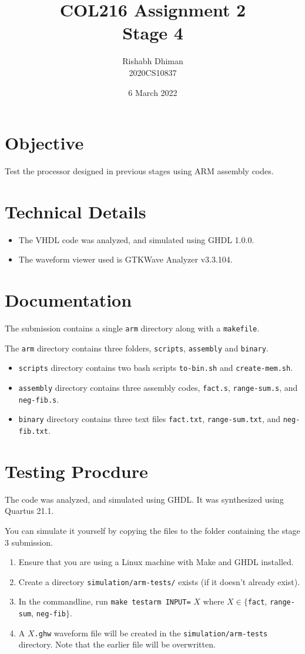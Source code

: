 \documentclass[a4paper]{scrartcl}
\title{COL216 Assignment 2\\{\Large Stage 4}}
\date{6 March 2022}
\author{Rishabh Dhiman\\ 2020CS10837}
\renewcommand{\tt}{\texttt}
\begin{document}
\maketitle

\section{Objective}
Test the processor designed in previous stages using ARM assembly codes.

\section{Technical Details}
\begin{itemize}
	\item The VHDL code was analyzed, and simulated using GHDL 1.0.0.
	\item The waveform viewer used is GTKWave Analyzer v3.3.104.
\end{itemize}

\section{Documentation}
The submission contains a single \tt{arm} directory along with a \tt{makefile}.

The \tt{arm} directory contains three folders, \tt{scripts}, \tt{assembly} and \tt{binary}.
\begin{itemize}
    \item \tt{scripts} directory contains two bash scripts \tt{to-bin.sh} and \tt{create-mem.sh}.
    \item \tt{assembly} directory contains three assembly codes, \tt{fact.s}, \tt{range-sum.s}, and \tt{neg-fib.s}.
    \item \tt{binary} directory contains three text files \tt{fact.txt}, \tt{range-sum.txt}, and \tt{neg-fib.txt}.
\end{itemize}

\section{Testing Procdure}
The code was analyzed, and simulated using GHDL. It was synthesized using Quartus 21.1.

You can simulate it yourself by copying the files to the folder containing the stage 3 submission.
\begin{enumerate}
    \item Ensure that you are using a Linux machine with Make and GHDL installed.
    \item Create a directory \tt{simulation/arm-tests/} exists (if it doesn't already exist).
    \item In the commandline, run \tt{make testarm INPUT=} $X$ where $X \in \{$\tt{fact}, \tt{range-sum}, \tt{neg-fib}$\}$.
    \item A $X$\tt{.ghw} waveform file will be created in the \tt{simulation/arm-tests} directory. Note that the earlier file will be overwritten.
\end{enumerate}
\end{document}
